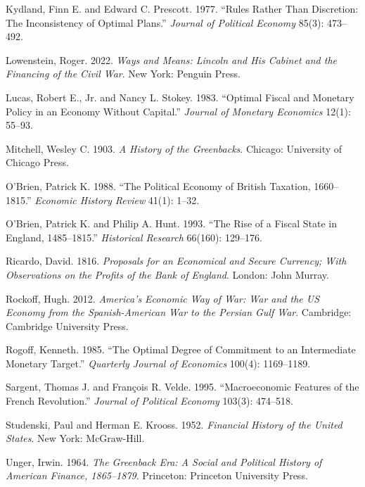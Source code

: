 \documentclass[12pt]{article}
\begin{document}
\begin{description}
\item Kydland, Finn E. and Edward C. Prescott. 1977. ``Rules Rather
Than Discretion: The Inconsistency of Optimal Plans.'' \textit{Journal
of Political Economy} 85(3): 473--492.

\item Lowenstein, Roger. 2022. \textit{Ways and Means: Lincoln and His
Cabinet and the Financing of the Civil War}. New York: Penguin Press.

\item Lucas, Robert E., Jr. and Nancy L. Stokey. 1983. ``Optimal Fiscal
and Monetary Policy in an Economy Without Capital.'' \textit{Journal of
Monetary Economics} 12(1): 55--93.

\item Mitchell, Wesley C. 1903. \textit{A History of the Greenbacks}.
Chicago: University of Chicago Press.

\item O'Brien, Patrick K. 1988. ``The Political Economy of British
Taxation, 1660--1815.'' \textit{Economic History Review} 41(1): 1--32.

\item O'Brien, Patrick K. and Philip A. Hunt. 1993. ``The Rise of a
Fiscal State in England, 1485--1815.'' \textit{Historical Research}
66(160): 129--176.

\item Ricardo, David. 1816. \textit{Proposals for an Economical and
Secure Currency; With Observations on the Profits of the Bank of
England}. London: John Murray.

\item Rockoff, Hugh. 2012. \textit{America's Economic Way of War: War
and the US Economy from the Spanish-American War to the Persian Gulf
War}. Cambridge: Cambridge University Press.

\item Rogoff, Kenneth. 1985. ``The Optimal Degree of Commitment to an
Intermediate Monetary Target.'' \textit{Quarterly Journal of Economics}
100(4): 1169--1189.

\item Sargent, Thomas J. and Fran\c{c}ois R. Velde. 1995. ``Macroeconomic
Features of the French Revolution.'' \textit{Journal of Political
Economy} 103(3): 474--518.

\item Studenski, Paul and Herman E. Krooss. 1952. \textit{Financial
History of the United States}. New York: McGraw-Hill.

\item Unger, Irwin. 1964. \textit{The Greenback Era: A Social and
Political History of American Finance, 1865--1879}. Princeton:
Princeton University Press.

\end{description}
\end{document}
